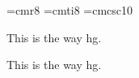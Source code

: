 

\font\eightrm=cmr8
\font\eightit=cmti8
\def\footnotesize{\eightrm \let\it=\eightit \baselineskip=9pt}
\font\tensc=cmcsc10
\let\sc=\tensc
\def\textsc#1{{\sc #1}}

This is the way \textsc{hg}.

\footnotesize
This is the way \textsc{hg}.
\endinput

\makeatletter

\def\goop{\pst@ifstar\goopA}
\def\goopA #1 \par{\writeln{->#1<-}}


\goop this

\goop* this

\goop*this








\resetatcatcode
